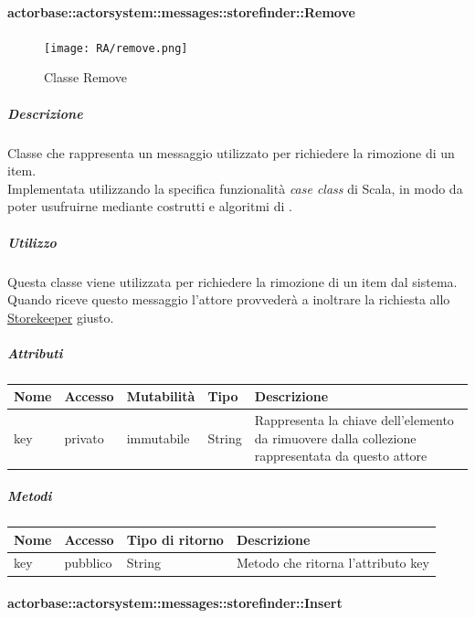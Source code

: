\documentclass{scalatekids-article}
\begin{document}
\paragraph{actorbase::actorsystem::messages::storefinder::Remove}
\label{sec:actorbase::actorsystem::messages::storefinder::Remove}

\begin{figure}[H]
  \begin{center}
    \texttt{[image: RA/remove.png]}
    \caption{Classe Remove}
  \end{center}
\end{figure}

\subparagraph{Descrizione}
Classe che rappresenta un messaggio utilizzato per richiedere la rimozione di un item.\\Implementata utilizzando la specifica funzionalità \textit{case class} di Scala,
in modo da poter usufruirne mediante costrutti e algoritmi di
.

\subparagraph{Utilizzo}
Questa classe viene utilizzata per richiedere la rimozione di un item dal
sistema.\\Quando riceve questo messaggio l'attore provvederà a inoltrare la
richiesta allo \hyperref[sec:actorbase::actorsystem::actors::storekeeper::Storekeeper]{Storekeeper}
giusto.

\subparagraph{Attributi}
\begin{tabular}{| p{2cm} | p{1.5cm} | p{2cm} | p{3cm} | p{8.5cm} |}
  \hline
  Nome & Accesso & Mutabilità & Tipo & Descrizione\\
  \hline
  key & privato & immutabile & String & Rappresenta la chiave dell'elemento da rimuovere dalla collezione rappresentata da questo attore\\
  \hline
\end{tabular}

\subparagraph{Metodi}
\begin{tabular}{| l | l | l | l |}
  \hline
  Nome & Accesso & Tipo di ritorno & Descrizione\\
  \hline
  key & pubblico & String & Metodo che ritorna l'attributo key\\
  \hline
\end{tabular}

\paragraph{actorbase::actorsystem::messages::storefinder::Insert}
\label{sec:actorbase::actorsystem::messages::storefinder::Insert}
\end{document}
